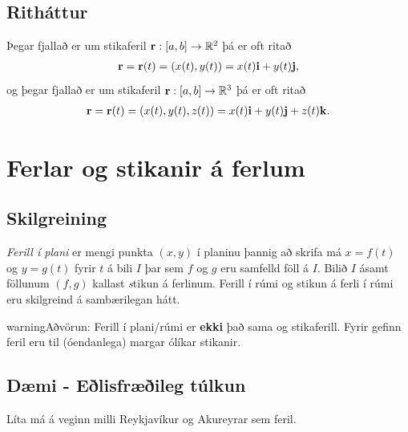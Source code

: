 \documentclass[a4paper,10pt,icelandic]{sphinxmanual}
\begin{document}
\subsection{Ritháttur}
\label{Kafli1:rithattur}
Þegar fjallað er um stikaferil
\(\mbox{${\bf r}$}:  [a,b]\rightarrow {\mathbb  R}^2\) þá er oft
ritað
\begin{gather}
\begin{split}\displaystyle \mbox{${\bf r}$}=\mbox{${\bf r}$}(t)=(x(t),y(t))=x(t)\mbox{${\bf i}$}+y(t)\mbox{${\bf j}$},\end{split}\notag
\end{gather}
og þegar fjallað er um stikaferil
\(\mbox{${\bf r}$}:  [a,b]\rightarrow {\mathbb  R}^3\) þá er oft
ritað
\begin{gather}
\begin{split}\displaystyle \mbox{${\bf r}$}=\mbox{${\bf r}$}(t)=(x(t),y(t),z(t))=x(t)\mbox{${\bf i}$}+y(t)\mbox{${\bf j}$}+z(t)\mbox{${\bf k}$}.\end{split}\notag
\end{gather}

\section{Ferlar og stikanir á ferlum}
\label{Kafli1:ferlar-og-stikanir-a-ferlum}

\subsection{Skilgreining}
\label{Kafli1:id1}\label{Kafli1:index-1}
\emph{Ferill í plani} er mengi punkta \((x,y)\) í planinu þannig að
skrifa má \(x=f(t)\) og \(y=g(t)\) fyrir \(t\) á bili
\(I\) þar sem \(f\) og \(g\) eru samfelld föll á \(I\).
Bilið \(I\) ásamt föllunum \((f,g)\) kallast \emph{s}tikun á
ferlinum. Ferill í rúmi og stikun á ferli í rúmi eru skilgreind á
sambærilegan hátt.

\begin{notice}{warning}{Aðvörun:}
Ferill í plani/rúmi er \textbf{ekki} það sama og stikaferill. Fyrir gefinn
feril eru til (óendanlega) margar ólíkar stikanir.
\end{notice}


\subsection{Dæmi - Eðlisfræðileg túlkun}
\label{Kafli1:daemi-elisfraeileg-tulkun}
Líta má á veginn milli Reykjavíkur og Akureyrar sem feril.
\end{document}
